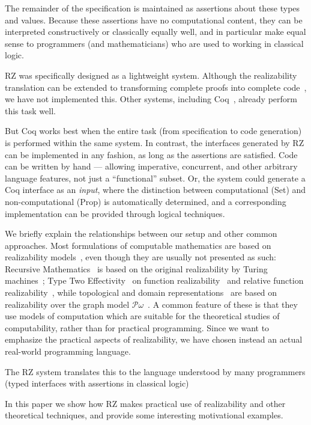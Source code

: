 The remainder of the specification is maintained as assertions about
these types and values. Because these assertions have no computational
content, they can be interpreted constructively or classically equally
well, and in particular make equal sense to programmers (and
mathematicians) who are used to working in classical logic.

\bigskip

RZ was specifically designed as a lightweight system. Although the
realizability translation can be extended to transforming complete
proofs into complete code~\cite{komagata+:tr95}, we have not
implemented this. Other systems, including Coq~\cite{coq}, already
perform this task well.

But Coq works best when the entire task (from specification to code
generation) is performed within the same system. In contrast, the
interfaces generated by RZ can be implemented in any fashion, as long
as the assertions are satisfied. Code can be written by hand ---
allowing imperative, concurrent, and other arbitrary language
features, not just a ``functional'' subset. Or, the system could
generate a Coq interface as an \emph{input}, where the distinction
between computational (Set) and non-computational (Prop) is
automatically determined, and a corresponding implementation can be
provided through logical techniques.


We briefly explain the relationships between our setup and other
common approaches. Most formulations of computable mathematics are
based on realizability models~\cite{Bauer:00}, even though they are
usually not presented as such: Recursive
Mathematics~\cite{recursive-math} is based on the original
realizability by Turing machines~\cite{KleeneSC:intint}; Type Two
Effectivity~\cite{Wei00} on function
realizability~\cite{KleeneSC:fouim} and relative function
realizability~\cite{BirkedalL:devttc}, while topological and domain
representations~\cite{Bla97a,Bauer:Birkedal:Scott:98} are based on
realizability over the graph model
$\mathcal{P}\omega$~\cite{ScottD:dattl}. A common feature of these is
that they use models of computation which are suitable for the
theoretical studies of computability, rather than for practical
programming. Since we want to emphasize the practical aspects of
realizability, we have chosen instead an actual real-world programming
language.


The RZ system translates this to the language understood by many
programmers (typed interfaces with assertions in classical logic)

\bigskip

In this paper we show how RZ makes practical use of realizability and
other theoretical techniques, and provide some interesting motivational
examples.


